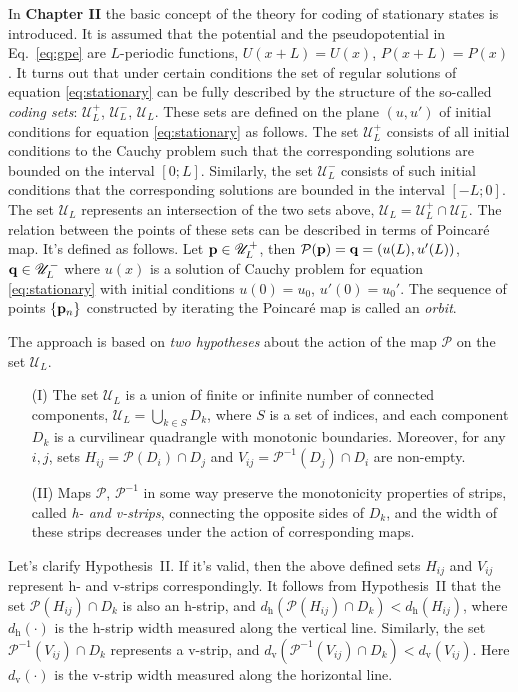 \documentclass[candidate, href, colorlinks]{disser}
\begin{document}
In \textbf{Chapter II} the basic concept of the theory for coding of stationary states is introduced.
It is assumed that the potential and the pseudopotential in Eq.~\eqref{eq:gpe} are $L$-periodic functions, $U(x + L) = U(x)$, $P(x + L) = P(x)$.
It turns out that under certain conditions the set of regular solutions of equation \eqref{eq:stationary} can be fully described by the structure of the so-called {\it coding sets}: $\mathscr{U}_L^+$, $\mathscr{U}_L^-$, $\mathscr{U}_L$.
These sets are defined on the plane $(u, u')$ of initial conditions for equation \eqref{eq:stationary} as follows.
The set $\mathscr{U}_L^+$ consists of all initial conditions to the Cauchy problem such that the corresponding solutions are bounded on the interval $[0; L]$.
Similarly, the set $\mathscr{U}_L^-$ consists of such initial conditions that the corresponding solutions are bounded in the interval $[-L; 0]$.
The set $\mathscr{U}_L$ represents an intersection of the two sets above, $\mathscr{U}_L = \mathscr{U}_L^+ \cap \mathscr{U}_L^-$.
The relation between the points of these sets can be described in terms of Poincar\'e map.
It's defined as follows.
Let $\vb{p} \in \mathscr{U}_L^+$, then $\mathcal{P} (\vb{p}) = \vb{q} = (u(L), u'(L))$, $\vb{q} \in \mathscr{U}_L^-$ where $u(x)$ is a solution of Cauchy problem for equation \eqref{eq:stationary} with initial conditions $u(0) = u_0$, $u'(0) = u_0'$.
The sequence of points $\{ \vb{p}_n \}$ constructed by iterating the Poincar\'e map is called an {\it orbit}.

The approach is based on {\it two hypotheses} about the action of the map $\mathcal{P}$ on the set $\mathscr{U}_L$.
\begin{itemize}
	\item[(I)] The set $\mathscr{U}_L$ is a union of finite or infinite number of connected components, $\mathscr{U}_L = \bigcup_{k \in S} D_k$, where $S$ is a set of indices, and each component $D_k$ is a curvilinear quadrangle with monotonic boundaries.
		Moreover, for any $i, j$, sets $H_{ij} = \mathcal{P}(D_i) \cap D_j$ and $V_{ij} = \mathcal{P}^{-1}(D_j) \cap D_i$ are non-empty.
	\item[(II)] Maps $\mathcal{P}$, $\mathcal{P}^{-1}$ in some way preserve the monotonicity properties of strips, called {\it h- and v-strips}, connecting the opposite sides of $D_k$, and the width of these strips decreases under the action of corresponding maps. 
\end{itemize}
Let's clarify Hypothesis~II.
If it's valid, then the above defined sets $H_{ij}$ and $V_{ij}$ represent h- and v-strips correspondingly.
It follows from Hypothesis~II that the set $\mathcal{P}(H_{ij}) \cap D_k$ is also an h-strip, and $d_{\mathrm{h}}(\mathcal{P}(H_{ij}) \cap D_k) < d_{\mathrm{h}}(H_{ij})$, where $d_{\mathrm{h}}(\cdot)$ is the h-strip width measured along the vertical line.
Similarly, the set $\mathcal{P}^{-1}(V_{ij}) \cap D_k$ represents a v-strip, and $d_{\mathrm{v}}(\mathcal{P}^{-1}(V_{ij}) \cap D_k) < d_{\mathrm{v}}(V_{ij})$.
Here $d_{\mathrm{v}}(\cdot)$ is the v-strip width measured along the horizontal line.
\end{document}
